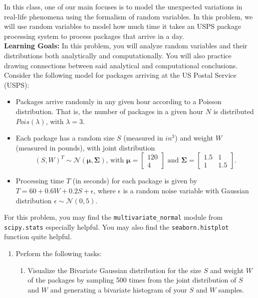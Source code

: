\documentclass{harvardml}
\theoremstyle{definition}
\theoremstyle{plain}
\begin{document}
\begin{problem}
In this class, one of our main focuses is to model the unexpected variations in real-life phenomena using the formalism of random variables. In this problem, we will use random variables to model how much time it takes an USPS package processing system to process packages that arrive in a day.\\

\noindent \textbf{Learning Goals:} In this problem, you will analyze random variables and their distributions both analytically and computationally. You will also practice drawing connections between said analytical and computational conclusions.\\

\noindent Consider the following model for packages arriving at the US Postal Service (USPS):
\begin{itemize}
    \item Packages arrive randomly in any given hour according to a Poisson distribution. That is, the number of packages in a given hour $N$ is distributed $Pois(\lambda)$, with $\lambda = 3$.
    \item Each package has a random size $S$ (measured in $in^3$) and weight $W$ (measured in pounds), with joint distribution
    $$(S, W)^{T} \sim \mathcal{N}\left( \boldsymbol{\mu}, \boldsymbol{\Sigma}\right) \text{, with } \boldsymbol{\mu} = \begin{bmatrix} 120 \\ 4 \end{bmatrix} \text{ and } \boldsymbol{\Sigma} = \begin{bmatrix} 1.5 & 1 \\ 1 & 1.5 \end{bmatrix}.$$
    \item Processing time $T$ (in seconds) for each package is given by $T = 60 + 0.6 W + 0.2 S + \epsilon$, where $\epsilon$ is a random noise variable with Gaussian distribution $\epsilon \sim \mathcal{N}(0, 5)$.
\end{itemize}
For this problem, you may find the \texttt{multivariate\_normal} module from \texttt{scipy.stats} especially helpful. You may also find the \texttt{seaborn.histplot} function quite helpful. 
\begin{enumerate}
    \item Perform the following tasks:
    \begin{enumerate}
        \item Visualize the Bivariate Gaussian distribution for the size $S$ and weight $W$ of the packages by sampling 500 times from the joint distribution of $S$ and $W$ and generating a bivariate histogram of your $S$ and $W$ samples.

\end{enumerate}
\end{enumerate}
\end{problem}
\end{document}
